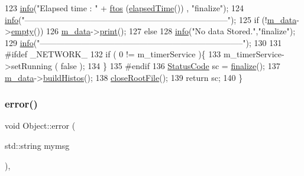\begin{DoxyCode}
123   \hyperlink{classObject_a644fd329ea4cb85f54fa6846484b84a8}{info}(\textcolor{stringliteral}{"Elapsed time               : "} + \hyperlink{Tools_8h_ae78000c70889d75d67813c6cb83010a6}{ftos} (\hyperlink{classProcessus_aecca96218c65bc805c988cd95447df55}{elapsedTime}())       , \textcolor{stringliteral}{"finalize"});
124   \hyperlink{classObject_a644fd329ea4cb85f54fa6846484b84a8}{info}(\textcolor{stringliteral}{"--------------------------------------------------------------------------"});
125   \textcolor{keywordflow}{if} (!\hyperlink{classProcessus_a3da9a9de8af54e2f47807a3e09dfccff}{m\_data}->\hyperlink{classData_ad3942803fea5649bf101220667ab5021}{empty}()) 
126     \hyperlink{classProcessus_a3da9a9de8af54e2f47807a3e09dfccff}{m\_data}->\hyperlink{classData_a779ce878d01483220b49ad9e513d7366}{print}();
127   \textcolor{keywordflow}{else} 
128     \hyperlink{classObject_a644fd329ea4cb85f54fa6846484b84a8}{info}(\textcolor{stringliteral}{"No data Stored."},\textcolor{stringliteral}{"finalize"});
129   \hyperlink{classObject_a644fd329ea4cb85f54fa6846484b84a8}{info}(\textcolor{stringliteral}{"--------------------------------------------------------------------------"});
130 
131 \textcolor{preprocessor}{#ifdef \_NETWORK\_}
132   \textcolor{keywordflow}{if} ( 0 != m\_timerService )\{
133     m\_timerService->setRunning ( \textcolor{keyword}{false} );
134   \}
135 \textcolor{preprocessor}{#endif}
136   \hyperlink{classStatusCode}{StatusCode} sc = \hyperlink{classProcessus_aba93d691f031bdb18ae4b8afb1b2e856}{finalize}();
137   \hyperlink{classProcessus_a3da9a9de8af54e2f47807a3e09dfccff}{m\_data}->\hyperlink{classData_a0c21ebc7662b7a6e25171959689481ca}{buildHistos}();  
138   \hyperlink{classProcessus_a2f3c41e99da4c738ea3d8f7b0d20a665}{closeRootFile}();
139   \textcolor{keywordflow}{return} sc;
140 \}
\end{DoxyCode}
\mbox{\label{classObject_a204a95f57818c0f811933917a30eff45}} 
\subsubsection{\texorpdfstring{error()}{error()}\hspace{0.1cm}{\footnotesize\ttfamily [1/2]}}
{\footnotesize\ttfamily void Object\+::error (\begin{DoxyParamCaption}\item[{std\+::string}]{mymsg }\end{DoxyParamCaption})\hspace{0.3cm}{\ttfamily [inline]}, {\ttfamily [inherited]}}



